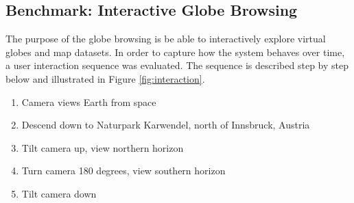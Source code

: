 \clearpage
\subsection{Benchmark: Interactive Globe Browsing}
\FloatBarrier
The purpose of the globe browsing is be able to interactively explore virtual globes and map datasets. In order to capture how the system behaves over time, a user interaction sequence was evaluated. The sequence is described step by step below and illustrated in Figure \ref{fig:interaction}.

\begin{enumerate}
  \item Camera views Earth from space
  \item Descend down to Naturpark Karwendel, north of Innsbruck, Austria
  \item Tilt camera up, view northern horizon
  \item Turn camera 180 degrees, view southern horizon
  \item Tilt camera down
\end{enumerate}

